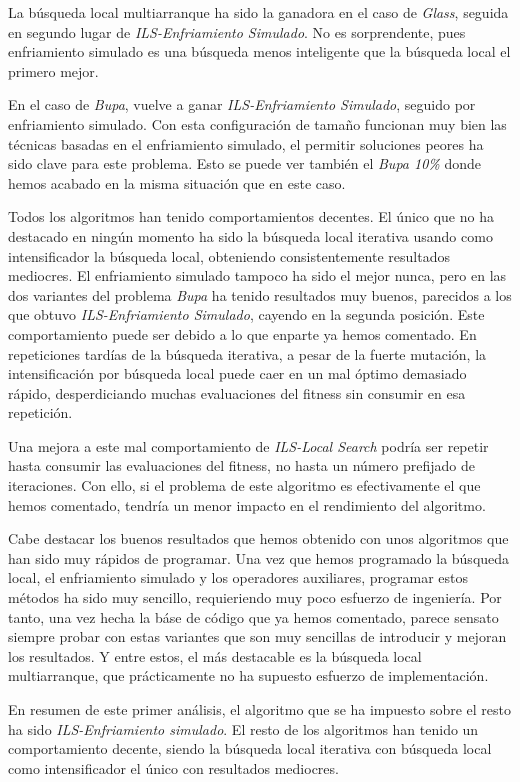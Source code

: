 \documentclass[11pt]{article}
\begin{document}
La búsqueda local multiarranque ha sido la ganadora en el caso de \emph{Glass}, seguida en segundo lugar de \emph{ILS-Enfriamiento Simulado}. No es sorprendente, pues enfriamiento simulado es una búsqueda menos inteligente que la búsqueda local el primero mejor.

En el caso de \emph{Bupa}, vuelve a ganar \emph{ILS-Enfriamiento Simulado}, seguido por enfriamiento simulado. Con esta configuración de tamaño funcionan muy bien las técnicas basadas en el enfriamiento simulado, el permitir soluciones peores ha sido clave para este problema. Esto se puede ver también el \emph{Bupa 10\%} donde hemos acabado en la misma situación que en este caso.

Todos los algoritmos han tenido comportamientos decentes. El único que no ha destacado en ningún momento ha sido la búsqueda local iterativa usando como intensificador la búsqueda local, obteniendo consistentemente resultados mediocres. El enfriamiento simulado tampoco ha sido el mejor nunca, pero en las dos variantes del problema \emph{Bupa} ha tenido resultados muy buenos, parecidos a los que obtuvo \emph{ILS-Enfriamiento Simulado}, cayendo en la segunda posición. Este comportamiento puede ser debido a lo que enparte ya hemos comentado. En repeticiones tardías de la búsqueda iterativa, a pesar de la fuerte mutación, la intensificación por búsqueda local puede caer en un mal óptimo demasiado rápido, desperdiciando muchas evaluaciones del fitness sin consumir en esa repetición.

Una mejora a este mal comportamiento de \emph{ILS-Local Search} podría ser repetir hasta consumir las evaluaciones del fitness, no hasta un número prefijado de iteraciones. Con ello, si el problema de este algoritmo es efectivamente el que hemos comentado, tendría un menor impacto en el rendimiento del algoritmo.

Cabe destacar los buenos resultados que hemos obtenido con unos algoritmos que han sido muy rápidos de programar. Una vez que hemos programado la búsqueda local, el enfriamiento simulado y los operadores auxiliares, programar estos métodos ha sido muy sencillo, requieriendo muy poco esfuerzo de ingeniería. Por tanto, una vez hecha la báse de código que ya hemos comentado, parece sensato siempre probar con estas variantes que son muy sencillas de introducir y mejoran los resultados. Y entre estos, el más destacable es la búsqueda local multiarranque, que prácticamente no ha supuesto esfuerzo de implementación.

En resumen de este primer análisis, el algoritmo que se ha impuesto sobre el resto ha sido \emph{ILS-Enfriamiento simulado}. El resto de los algoritmos han tenido un comportamiento decente, siendo la búsqueda local iterativa con búsqueda local como intensificador el único con resultados mediocres.
\end{document}

